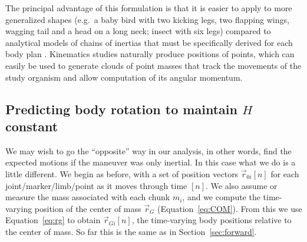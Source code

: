 \documentclass{amsart}
\begin{document}
The principal advantage of this formulation is that it is easier to apply to more generalized shapes (e.g.\ a baby bird with two kicking legs, two flapping wings, wagging tail and a head on a long neck; insect with six legs) compared to analytical models of chains of inertias that must be specifically derived for each body plan \cite{Jusufi:2008, Jusufi:2010, Evangelista:unpub2}.  Kinematics studies naturally produce positions of points, which can easily be used to generate clouds of point masses that track the movements of the study organism and allow computation of its angular momentum. 






\subsection{Predicting body rotation to maintain $H$ constant}
\label{sec:reverse}
We may wish to go the ``opposite'' way in our analysis, in other words, find the expected motions if the maneuver was only inertial.  In this case what we do is a little different.  We begin as before, with a set of position vectors $\vec{r}_{0i}[n]$ for each joint/marker/limb/point as it moves through time $[n]$. We also assume or measure the mass associated with each chunk $m_i$, and we compute the time-varying position of the center of mass $\vec{r}_G$ (Equation~\ref{eq:COM}). From this we use Equation~\ref{eq:rg} to obtain $\vec{r}_{Gi}[n]$, the time-varying body positions relative to the center of mass. So far this is the same as in Section~\ref{sec:forward}. 
\end{document}
